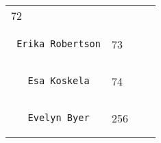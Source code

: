 \documentclass[]{article}
\begin{document}
\begin{longtable}[c]{@{}llll@{}}
\begin{minipage}[t]{0.10\columnwidth}
72
\end{minipage} & \begin{minipage}[t]{0.13\columnwidth}\raggedright
\end{minipage} & \begin{minipage}[t]{0.15\columnwidth}\raggedright
\end{minipage}
\\\noalign{\medskip}
\begin{minipage}[t]{0.39\columnwidth}\raggedright
\begin{verbatim}
 Erika Robertson
\end{verbatim}
\end{minipage} & \begin{minipage}[t]{0.10\columnwidth}\raggedright
73
\end{minipage} & \begin{minipage}[t]{0.13\columnwidth}\raggedright
\end{minipage} & \begin{minipage}[t]{0.15\columnwidth}\raggedright
\end{minipage}
\\\noalign{\medskip}
\begin{minipage}[t]{0.39\columnwidth}\raggedright
\begin{verbatim}
   Esa Koskela
\end{verbatim}
\end{minipage} & \begin{minipage}[t]{0.10\columnwidth}\raggedright
74
\end{minipage} & \begin{minipage}[t]{0.13\columnwidth}\raggedright
\end{minipage} & \begin{minipage}[t]{0.15\columnwidth}\raggedright
\end{minipage}
\\\noalign{\medskip}
\begin{minipage}[t]{0.39\columnwidth}\raggedright
\begin{verbatim}
   Evelyn Byer
\end{verbatim}
\end{minipage} & \begin{minipage}[t]{0.10\columnwidth}\raggedright
256
\end{minipage} & \begin{minipage}[t]{0.13\columnwidth}\raggedright
\end{minipage} & \begin{minipage}[t]{0.15\columnwidth}\raggedright

\end{minipage}
\end{longtable}
\end{document}
